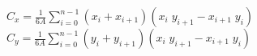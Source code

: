 $C_x = \frac{1}{6A}\sum_{i = 0}^{n - 1}(x_i + x_{i + 1})(x_i\; y_{i + 1} - x_{i + 1}\; y_i)$ \newline
$C_y = \frac{1}{6A}\sum_{i = 0}^{n - 1}(y_i + y_{i + 1})(x_i\; y_{i + 1} - x_{i + 1}\; y_i)$
